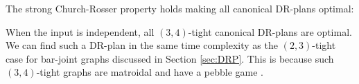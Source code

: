 

The strong Church-Rosser property holds\addin{,} making all canonical DR-plans optimal:
%
\begin{remark}\label{rem:1dofcanon}
    When the input is independent, all $(3,4)$-tight canonical DR-plans are optimal. We can find such a DR-plan in the same time complexity as the $(2,3)$-tight case for bar-joint graphs discussed in Section \ref{sec:DRP}. This is because such $(3,4)$-tight graphs are matroidal and have a pebble game \cite{Lee:2007:PGA}.
\end{remark}


\ClearMyMinHeight
{}


